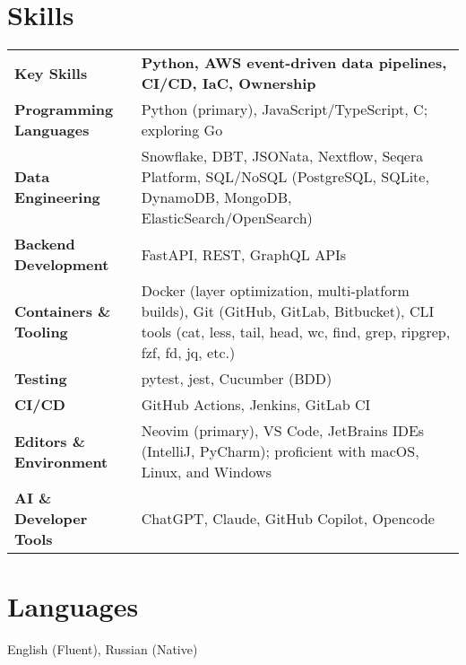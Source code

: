 \documentclass[a4paper,12pt]{article}
\begin{document}
\section{Skills}
\begin{tabularx}{\linewidth}{@{}l X@{}}
\textbf{Key Skills} & \textbf{Python, AWS event-driven data pipelines, CI/CD, IaC, Ownership} \\

\textbf{Programming Languages} & Python (primary), JavaScript/TypeScript, C; exploring Go \\

\textbf{Data Engineering} & Snowflake, DBT, JSONata, Nextflow, Seqera Platform, SQL/NoSQL (PostgreSQL, SQLite, DynamoDB, MongoDB, ElasticSearch/OpenSearch) \\

\textbf{Backend Development} & FastAPI, REST, GraphQL APIs \\

\textbf{Containers \& Tooling} & Docker (layer optimization, multi-platform builds), Git (GitHub, GitLab, Bitbucket), CLI tools (cat, less, tail, head, wc, find, grep, ripgrep, fzf, fd, jq, etc.) \\

\textbf{Testing} & pytest, jest, Cucumber (BDD) \\

\textbf{CI/CD} & GitHub Actions, Jenkins, GitLab CI \\

\textbf{Editors \& Environment} & Neovim (primary), VS Code, JetBrains IDEs (IntelliJ, PyCharm); proficient with macOS, Linux, and Windows \\

\textbf{AI \& Developer Tools} & ChatGPT, Claude, GitHub Copilot, Opencode \\
\end{tabularx}

\section{Languages}
English (Fluent), Russian (Native)

\vfill
{}
\end{document}
